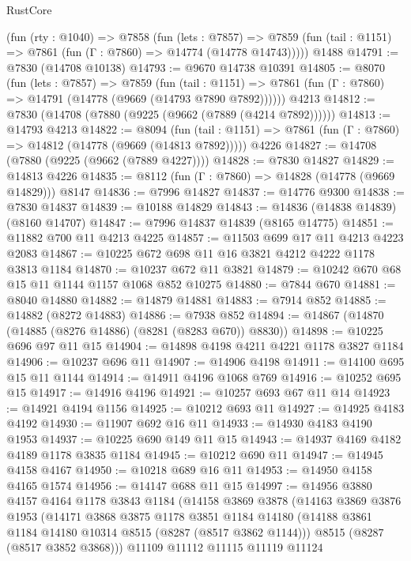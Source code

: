 \begin{lexlean}{RustCore}
\begin{coremodule}
    (fun (rty : @1040) =>
    @7858
      (fun (lets : @7857) =>
      @7859 (fun (tail : @1151) => @7861 (fun (Γ : @7860) => @14774 (@14778 @14743)))))
    @1488
@14791 := @7830 (@14708 @10138)
@14793 := @9670 @14738 @10391
@14805 := @8070
    (fun (lets : @7857) =>
    @7859
      (fun (tail : @1151) =>
      @7861 (fun (Γ : @7860) => @14791 (@14778 (@9669 (@14793 @7890 @7892))))))
    @4213
@14812 := @7830 (@14708 (@7880 (@9225 (@9662 (@7889 (@4214 @7892))))))
@14813 := @14793 @4213
@14822 := @8094
    (fun (tail : @1151) => @7861 (fun (Γ : @7860) => @14812 (@14778 (@9669 (@14813 @7892)))))
    @4226
@14827 := @14708 (@7880 (@9225 (@9662 (@7889 @4227))))
@14828 := @7830 @14827
@14829 := @14813 @4226
@14835 := @8112 (fun (Γ : @7860) => @14828 (@14778 (@9669 @14829))) @8147
@14836 := @7996 @14827
@14837 := @14776 @9300
@14838 := @7830 @14837
@14839 := @10188 @14829
@14843 := @14836 (@14838 @14839) (@8160 @14707)
@14847 := @7996 @14837 @14839 (@8165 @14775)
@14851 := @11882 @700 @11 @4213 @4225
@14857 := @11503 @699 @17 @11 @4213 @4223 @2083
@14867 := @10225 @672 @698 @11 @16 @3821 @4212 @4222 @1178 @3813 @1184
@14870 := @10237 @672 @11 @3821
@14879 := @10242 @670 @68 @15 @11 @1144 @1157 @1068 @852 @10275
@14880 := @7844 @670
@14881 := @8040 @14880
@14882 := @14879 @14881
@14883 := @7914 @852
@14885 := @14882 (@8272 @14883)
@14886 := @7938 @852
@14894 := @14867 (@14870 (@14885 (@8276 @14886) (@8281 (@8283 @670)) @8830))
@14898 := @10225 @696 @97 @11 @15
@14904 := @14898 @4198 @4211 @4221 @1178 @3827 @1184
@14906 := @10237 @696 @11
@14907 := @14906 @4198
@14911 := @14100 @695 @15 @11 @1144
@14914 := @14911 @4196 @1068 @769
@14916 := @10252 @695 @15
@14917 := @14916 @4196
@14921 := @10257 @693 @67 @11 @14
@14923 := @14921 @4194 @1156
@14925 := @10212 @693 @11
@14927 := @14925 @4183 @4192
@14930 := @11907 @692 @16 @11
@14933 := @14930 @4183 @4190 @1953
@14937 := @10225 @690 @149 @11 @15
@14943 := @14937 @4169 @4182 @4189 @1178 @3835 @1184
@14945 := @10212 @690 @11
@14947 := @14945 @4158 @4167
@14950 := @10218 @689 @16 @11
@14953 := @14950 @4158 @4165 @1574
@14956 := @14147 @688 @11 @15
@14997 := @14956
    @3880
    @4157
    @4164
    @1178
    @3843
    @1184
    (@14158
      @3869
      @3878
      (@14163
        @3869
        @3876
        @1953
        (@14171
          @3868
          @3875
          @1178
          @3851
          @1184
          @14180
          (@14188 @3861 @1184 @14180 @10314 @8515 (@8287 (@8517 @3862 @1144)))
          @8515
          (@8287 (@8517 @3852 @3868)))
        @11109
        @11112
        @11115
        @11119
        @11124

\end{coremodule}
\end{lexlean}
